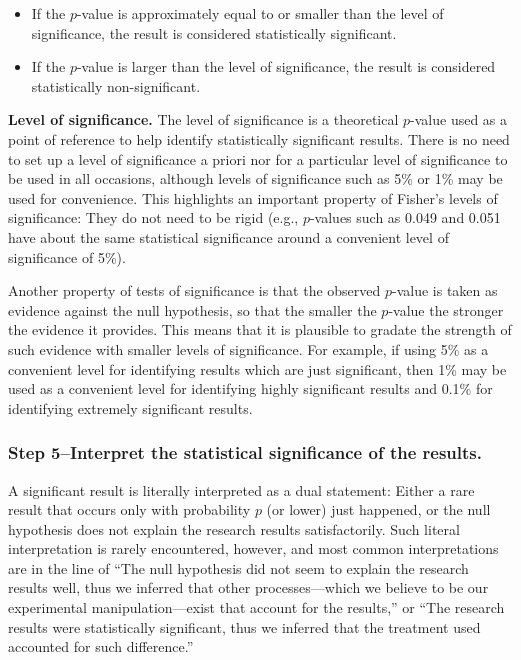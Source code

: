\documentclass[
]{book}
\providecommand{\tightlist}{%
  \setlength{\itemsep}{0pt}\setlength{\parskip}{0pt}}
\theoremstyle{definition}
\theoremstyle{definition}
\theoremstyle{definition}
\theoremstyle{definition}
\theoremstyle{remark}
\begin{document}
\begin{itemize}
\tightlist
\item
  If the \(p\)-value is approximately equal to or smaller than the level of significance, the result is considered statistically significant.
\item
  If the \(p\)-value is larger than the level of significance, the result is considered statistically non-significant.
\end{itemize}

\textbf{Level of significance.} The level of significance is a theoretical \(p\)-value used as a point of reference to help identify statistically significant results. There is no need to set up a level of significance a priori nor for a particular level of significance to be used in all occasions, although levels of significance such as 5\% or 1\% may be used for convenience. This highlights an important property of Fisher's levels of significance: They do not need to be rigid (e.g., \(p\)-values such as 0.049 and 0.051 have about the same statistical significance around a convenient level of significance of 5\%).

Another property of tests of significance is that the observed \(p\)-value is taken as evidence against the null hypothesis, so that the smaller the \(p\)-value the stronger the evidence it provides. This means that it is plausible to gradate the strength of such evidence with smaller levels of significance. For example, if using 5\% as a convenient level for identifying results which are just significant, then 1\% may be used as a convenient level for identifying highly significant results and 0.1\% for identifying extremely significant results.

\hypertarget{step-5interpret-the-statistical-significance-of-the-results.}{%
\subsubsection*{Step 5--Interpret the statistical significance of the results.}\label{step-5interpret-the-statistical-significance-of-the-results.}}

A significant result is literally interpreted as a dual statement: Either a rare result that occurs only with probability \(p\) (or lower) just happened, or the null hypothesis does not explain the research results satisfactorily. Such literal interpretation is rarely encountered, however, and most common interpretations are in the line of ``The null hypothesis did not seem to explain the research results well, thus we inferred that other processes---which we believe to be our experimental manipulation---exist that account for the results,'' or ``The research results were statistically significant, thus we inferred that the treatment used accounted for such difference.''
\end{document}
